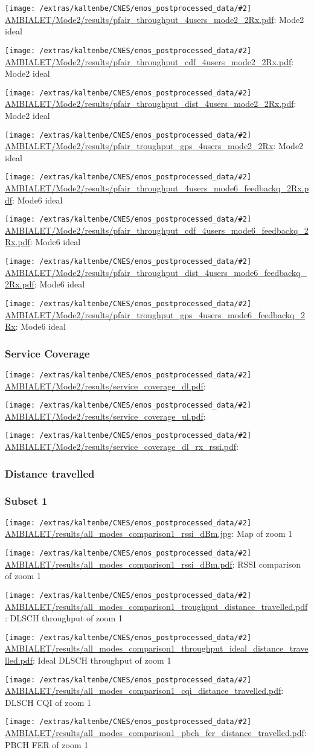 \documentclass[a4paper,10pt]{article}
\newcommand{\printfile}[2][]{
 \begin{minipage}{8cm}
  \centering
  \texttt{[image: /extras/kaltenbe/CNES/emos\_postprocessed\_data/\#2]}
  \url{#2}: #1

 \end{minipage}
}
\begin{document}
\printfile[Mode2 ideal]{AMBIALET/Mode2/results/pfair_throughput_4users_mode2_2Rx.pdf}
\printfile[Mode2 ideal]{AMBIALET/Mode2/results/pfair_throughput_cdf_4users_mode2_2Rx.pdf}

\printfile[Mode2 ideal]{AMBIALET/Mode2/results/pfair_throughput_dist_4users_mode2_2Rx.pdf}
\printfile[Mode2 ideal]{AMBIALET/Mode2/results/pfair_troughput_gps_4users_mode2_2Rx}

\printfile[Mode6 ideal]{AMBIALET/Mode2/results/pfair_throughput_4users_mode6_feedbackq_2Rx.pdf}
\printfile[Mode6 ideal]{AMBIALET/Mode2/results/pfair_throughput_cdf_4users_mode6_feedbackq_2Rx.pdf}

\printfile[Mode6 ideal]{AMBIALET/Mode2/results/pfair_throughput_dist_4users_mode6_feedbackq_2Rx.pdf}
\printfile[Mode6 ideal]{AMBIALET/Mode2/results/pfair_troughput_gps_4users_mode6_feedbackq_2Rx}

\subsubsection{Service Coverage}

\printfile{AMBIALET/Mode2/results/service_coverage_dl.pdf}
\printfile{AMBIALET/Mode2/results/service_coverage_ul.pdf}

\printfile{AMBIALET/Mode2/results/service_coverage_dl_rx_rssi.pdf}

\subsubsection{Distance travelled}
\label{sec:dist_travelled_ambialet}

\subsubsection*{Subset 1}

\printfile[Map of zoom 1]{AMBIALET/results/all_modes_comparison1_rssi_dBm.jpg}
\printfile[RSSI comparison of zoom 1]{AMBIALET/results/all_modes_comparison1_rssi_dBm.pdf}

\printfile[DLSCH throughput of zoom 1]{AMBIALET/results/all_modes_comparison1_troughput_distance_travelled.pdf}
\printfile[Ideal DLSCH throughput of zoom 1]{AMBIALET/results/all_modes_comparison1_throughput_ideal_distance_travelled.pdf}

\printfile[DLSCH CQI of zoom 1]{AMBIALET/results/all_modes_comparison1_cqi_distance_travelled.pdf}
\printfile[PBCH FER of zoom 1]{AMBIALET/results/all_modes_comparison1_pbch_fer_distance_travelled.pdf}
\end{document}
